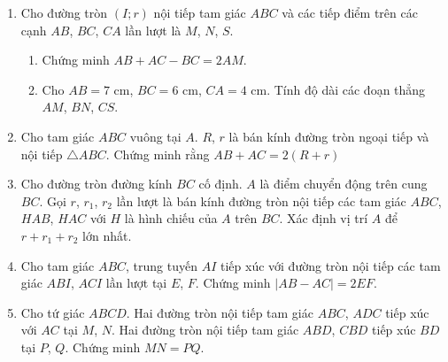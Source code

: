 	
\begin{bt}%
	\begin{enumerate}	
		\item 
		Cho đường tròn $(I;r)$ nội tiếp tam giác $ABC$ và các tiếp điểm trên các cạnh $AB$, $BC$, $CA$ lần lượt là $M$, $N$, $S$.
		\begin{enumerate}[1)]
			\item Chứng minh $AB+AC-BC=2AM$.
			\item Cho $AB=7$ cm, $BC=6$ cm, $CA=4$ cm. Tính độ dài các đoạn thẳng $AM$, $BN$, $CS$.
		\end{enumerate}	
		\item 
		Cho tam giác $ABC$ vuông tại $A$. $R$, $r$ là bán kính đường tròn ngoại tiếp và nội tiếp $\triangle ABC$. Chứng minh rằng $AB+AC=2(R+r)$
		\item 
		Cho đường tròn đường kính $BC$ cố định. $A$ là điểm chuyển động trên cung $BC$. Gọi $r$, $r_1$, $r_2$ lần lượt là bán kính đường tròn nội tiếp các tam giác $ABC$, $HAB$, $HAC$ với $H$ là hình chiếu của $A$ trên $BC$. Xác định vị trí $A$ để $r+r_1+r_2$ lớn nhất.
		\item
		Cho tam giác $ABC$, trung tuyến $AI$ tiếp xúc với đường tròn nội tiếp các tam giác $ABI$, $ACI$ lần lượt tại $E$, $F$. Chứng minh $\left| AB-AC \right|=2EF$.
		\item 
		Cho tứ giác $ABCD$. Hai đường tròn nội tiếp tam giác $ABC$, $ADC$ tiếp xúc với $AC$ tại $M$, $N$. Hai đường tròn nội tiếp tam giác $ABD$, $CBD$ tiếp xúc $BD$ tại $P$, $Q$. Chứng minh $MN=PQ$.		
	\end{enumerate}
\end{bt}
